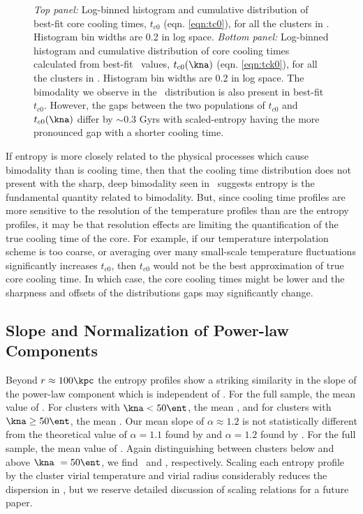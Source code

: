 \begin{figure}[htp]
\begin{center}
\begin{minipage}[htp]{0.8\linewidth}
    \end{minipage}
  \end{center}
  \caption[Histograms and cumulative distributions of cooling
    times.]{{\it{Top panel:}} Log-binned histogram and cumulative
    distribution of best-fit core cooling times, $t_{c0}$
    (eqn. \ref{eqn:tc0}), for all the clusters in \accept. Histogram
    bin widths are 0.2 in log space. {\it{Bottom panel:}} Log-binned
    histogram and cumulative distribution of core cooling times
    calculated from best-fit \kna\ values, $t_{c0}(\kna)$
    (eqn. \ref{eqn:tck0}), for all the clusters in \accept. Histogram
    bin widths are 0.2 in log space. The bimodality we observe in the
    \kna\ distribution is also present in best-fit $t_{c0}$. However,
    the gaps between the two populations of $t_{c0}$ and
    $t_{c0}(\kna)$ differ by $\sim 0.3$ Gyrs with scaled-entropy
    having the more pronounced gap with a shorter cooling time.}
  \label{fig:t0}
\end{figure}

If entropy is more closely related to the physical processes which
cause bimodality than is cooling time, then that the cooling time
distribution does not present with the sharp, deep bimodality seen in
\kna\ suggests entropy is the fundamental quantity related to
bimodality. But, since cooling time profiles are more sensitive to the
resolution of the temperature profiles than are the entropy profiles,
it may be that resolution effects are limiting the quantification of
the true cooling time of the core. For example, if our temperature
interpolation scheme is too coarse, or averaging over many small-scale
temperature fluctuations significantly increases $t_{c0}$, then
$t_{c0}$ would not be the best approximation of true core cooling
time. In which case, the core cooling times might be lower and the
sharpness and offsets of the distributions gaps may significantly
change.

\subsection{Slope and Normalization of Power-law Components}
\label{sec:entsuppslopes}

Beyond $r \approx 100 \kpc$ the entropy profiles show a striking
similarity in the slope of the power-law component which is
independent of \kna. For the full sample, the mean value of \alphafs.
For clusters with $\kna < 50 \ent$, the mean \alphaga, and for
clusters with $\kna \geq 50 \ent$, the mean \alphagb. Our mean slope
of $\alpha \approx 1.2$ is not statistically different from the
theoretical value of $\alpha = 1.1$ found by \citet{tozzi01} and
$\alpha = 1.2$ found by \citet{vkb05}. For the full sample, the mean
value of \khunfs. Again distinguishing between clusters below and
above $\kna\ = 50 \ent$, we find \khunga\ and \khungb,
respectively. Scaling each entropy profile by the cluster virial
temperature and virial radius considerably reduces the dispersion in
\khun, but we reserve detailed discussion of scaling relations for a
future paper.

